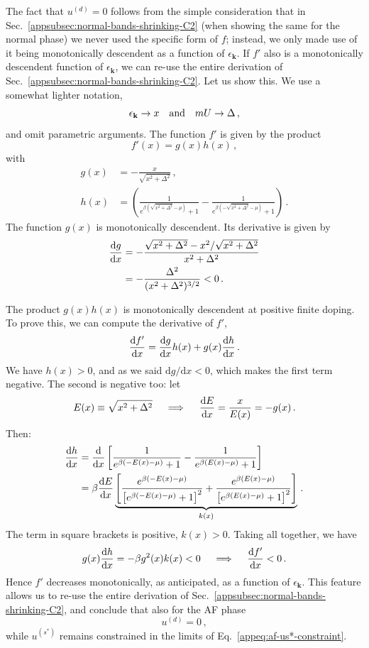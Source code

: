 \begin{tabproof}
The fact that $u^{(d)}=0$ follows from the simple consideration that in Sec.~\ref{appsubsec:normal-bands-shrinking-C2} (when showing the same for the normal phase) we never used the specific form of $f$; instead, we only made use of it being monotonically descendent as a function of $\epsilon_\mathbf{k}$. If $f'$ also is a monotonically descendent function of $\epsilon_\mathbf{k}$, we can re-use the entire derivation of Sec.~\ref{appsubsec:normal-bands-shrinking-C2}. Let us show this. We use a somewhat lighter notation,
\[
	\epsilon_\mathbf{k} \to x
	\qq{and}
	mU \to \Delta \, ,
\]
and omit parametric arguments. The function $f'$ is given by the product
\[
	f'(x) = g(x) h(x) \, ,
\]
with
\[
\begin{aligned}
	g(x) &= -\frac{x}{\sqrt{x^2 + \Delta^2}} \, ,\\
	h(x) &= \left(
	\frac{1}{e^{\beta(\sqrt{x^2+\Delta^2}-\mu)}+1} - \frac{1}{e^{\beta(-\sqrt{x^2+\Delta^2}-\mu)}+1} 
	\right) \, .
\end{aligned}
\]
The function $g(x)$ is monotonically descendent. Its derivative is given by
\[
\begin{aligned}
	\dv{g}{x} &= - \frac{\sqrt{x^2 + \Delta^2} - x^2/\sqrt{x^2 + \Delta^2}}{x^2 + \Delta^2} \\
	&= -\frac{\Delta^2}{(x^2 + \Delta^2)^{3/2}} < 0 \, .
\end{aligned}
\]

The product $g(x)h(x)$ is monotonically descendent at positive finite doping. To prove this, we can compute the derivative of $f'$,
\[
	\dv{f'}{x} = \dv{g}{x} h(x) + g(x) \dv{h}{x} \, .
\]
We have $h(x)>0$, and as we said $\mathrm{d}g/\mathrm{d}x<0$, which makes the first term negative. The second is negative too: let
\[
	E(x) \equiv \sqrt{x^2 + \Delta^2}
	\quad\implies\quad
	\dv{E}{x} = \frac{x}{E(x)} = -g(x) \, .
\]
Then:
\[
\begin{aligned}
	\dv{h}{x} &= \dv{}{x} \left[
	\frac{1}{e^{\beta(-E(x)-\mu)}+1} - \frac{1}{e^{\beta(E(x)-\mu)}+1}
	\right] \\
	&= \beta \dv{E}{x} \underbrace{
		\left[
		\frac{e^{\beta(-E(x)-\mu)}}{\left[e^{\beta(-E(x)-\mu)}+1\right]^2} + \frac{e^{\beta(E(x)-\mu)}}{\left[e^{\beta(E(x)-\mu)}+1\right]^2}
		\right]	
	}_{k(x)} \, .
\end{aligned}
\]
The term in square brackets is positive, $k(x)>0$. Taking all together, we have
\[
	g(x) \dv{h}{x} = -\beta g^2(x) k(x) < 0
	\quad\implies\quad
	\dv{f'}{x} < 0 \, .
\]
Hence $f'$ decreases monotonically, as anticipated, as a function of $\epsilon_\mathbf{k}$. This feature allows us to re-use the entire derivation of Sec.~\ref{appsubsec:normal-bands-shrinking-C2}, and conclude that also for the AF phase
\[
	u^{(d)} = 0 \, ,
\]
while $u^{(s^*)}$ remains constrained in the limits of Eq.~\eqref{appeq:af-us*-constraint}.

\end{tabproof}